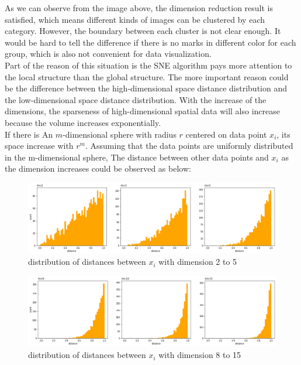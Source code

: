 As we can observe from the image above, the dimension reduction result is satisfied, which means different kinds of images can be clustered by each category. However, the boundary between each cluster is not clear enough. It would be hard to tell the difference if there is no marks in different color for each group, which is also not convenient for data visualization.\\  

\noindent Part of the reason of this situation is the SNE algorithm pays more attention to the local structure than the global structure. The more important reason could be the difference between the high-dimensional space distance distribution and the low-dimensional space distance distribution. With the increase of the dimensions, the sparseness of high-dimensional spatial data will also increase because the volume increases exponentially.\\

\noindent If there is An $m$-dimensional sphere with radius $r$ centered on data point $x_i$, its space increase with $r^m$. Assuming that the data points are uniformly distributed in the m-dimensional sphere, The distance between other data points and $x_i$ as the dimension increases could be observed as below:

\begin{figure}[ht]

\centering
\includegraphics[scale=0.34]{images/image_crowding_problem_1.png}
\caption{distribution of distances between $x_i$ with dimension 2 to 5}
\label{fig:label}
\end{figure}

\begin{figure}[ht]

\centering
\includegraphics[scale=0.34]{images/image_crowding_problem_2.png}
\caption{distribution of distances between $x_i$ with dimension 8 to 15}
\label{fig:label}
\end{figure}

